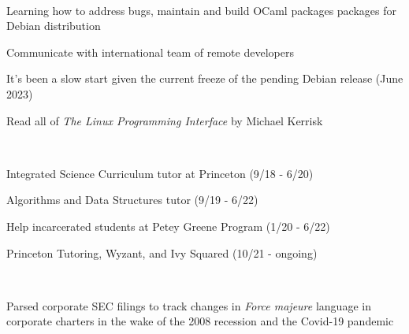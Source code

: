 \documentclass[a4paper]{MagicalCV}
\begin{document}
\begin{minipage}[t]{0.66\textwidth} 



 \\
\vspace{\topsep} %
\begin{tightemize}
\item Learning how to address bugs, maintain and build OCaml packages packages for Debian distribution
\item Communicate with international team of remote developers
\item It's been a slow start given the current freeze of the pending Debian release (June 2023)
\item Read all of \textit{The Linux Programming Interface} by Michael Kerrisk
\end{tightemize}
\sectionsep


 \\
\vspace{\topsep} %
\begin{tightemize}
\item Integrated Science Curriculum tutor at Princeton (9/18 - 6/20)
\item Algorithms and Data Structures tutor (9/19 - 6/22)
\item Help incarcerated students at Petey Greene Program (1/20 - 6/22)
\item Princeton Tutoring, Wyzant, and Ivy Squared (10/21 - ongoing)
\end{tightemize}
\sectionsep

 \\
\vspace{\topsep} %
\begin{tightemize}
\item Parsed corporate SEC filings to track changes in \textit{Force majeure} language in corporate charters in the wake of the 2008 recession and the Covid-19 pandemic
\end{tightemize}
\sectionsep


\end{minipage}
\end{document}
